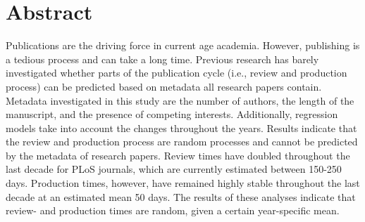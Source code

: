 \section*{Abstract}
Publications are the driving force in current age academia. However, publishing is a tedious process and can take a long time. Previous research has barely investigated whether parts of the publication cycle (i.e., review and production process) can be predicted based on metadata all research papers contain. Metadata investigated in this study are the number of authors, the length of the manuscript, and the presence of competing interests. Additionally, regression models take into account the changes throughout the years. Results indicate that the review and production process are random processes and cannot be predicted by the metadata of research papers. Review times have doubled throughout the last decade for PLoS journals, which are currently estimated between 150-250 days. Production times, however, have remained highly stable throughout the last decade at an estimated mean 50 days. The results of these analyses indicate that review- and production times are random, given a certain year-specific mean. 
  